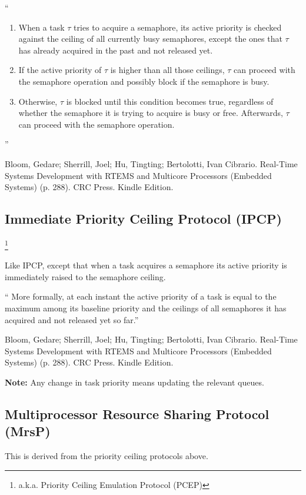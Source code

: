 ``
\begin{enumerate}
  \item
    When a task $\tau$ tries to acquire a semaphore,
    its active priority is checked against
    the ceiling of all currently busy semaphores,
    except the ones that $\tau$ has already acquired in the past and not released yet.
  \item
    If the active priority of $\tau$ is higher than all those ceilings,
    $\tau$ can proceed with the semaphore operation
    and possibly block if the semaphore is busy.
  \item
    Otherwise, $\tau$ is blocked until this condition becomes true,
    regardless of whether  the semaphore it is trying to acquire is busy or free.
    Afterwards, $\tau$ can proceed  with the semaphore operation.
\end{enumerate}
''

Bloom, Gedare; Sherrill, Joel; Hu, Tingting; Bertolotti, Ivan Cibrario. Real-Time Systems Development with RTEMS and Multicore Processors (Embedded Systems) (p. 288). CRC Press. Kindle Edition.

\subsection{Immediate Priority Ceiling Protocol (IPCP)}%
\footnote{
a.k.a. Priority Ceiling Emulation Protocol (PCEP)
}

Like IPCP, except that when a task acquires a semaphore its active priority
is immediately raised to the semaphore ceiling.

``
More formally,
at each instant
the active priority of a task is equal to the maximum
among its baseline priority
and the ceilings of all semaphores it has acquired and not released  yet so far.''

Bloom, Gedare; Sherrill, Joel; Hu, Tingting; Bertolotti, Ivan Cibrario. Real-Time Systems Development with RTEMS and Multicore Processors (Embedded Systems) (p. 288). CRC Press. Kindle Edition.

\textbf{Note: }
\textsf{Any change in task priority means updating the relevant queues}.

\subsection{Multiprocessor Resource Sharing Protocol (MrsP)}

This is derived from the priority ceiling protocols above.


